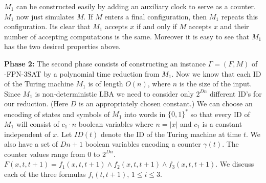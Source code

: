 $M_1$ can be constructed easily by adding an auxiliary  clock to serve 
as a counter. $M_1$ now just simulates $M$.  
If $M$ enters a final configuration, then $M_1$ repeats this
configuration. Its clear that 
$M_1$ accepts $x$
if and only if $M$ accepts $x$ and their number of
accepting computations is the same. Moreover it is easy to see that
$M_1$ has the two desired properties above.



\noindent
{\bf Phase 2:}
The second phase consists of constructing an instance 
$\Gamma = (F, M)$ of 
{-FPN-3SAT} by a polynomial time reduction from $M_1$. 
Now we know that each ID of the Turing machine $M_1$ is 
of length $O(n)$, where $n$ is the size of the input.
Since $M_1$ is non-deterministic {\sf LBA}
we need to consider only $2^{Dn}$ different ID's for
our reduction. (Here $D$ is an appropriately chosen constant.)  
We can choose
an encoding of states and symbols of $M_1$ into words in $\{0,1\}^*$ so
that every ID of $M_1$ will consist of $c_1 \cdot n$ boolean variables where
$n=|x|$ and $c_1$ is a constant independent of $x$. Let $ID(t)$ denote
the {\sf ID} of the Turing machine at time $t$. We also have 
a set of $Dn+1$ boolean variables encoding a counter $\gamma(t)$. The counter
values range from $0$ to $2^{Dn}$. 
$F(x, t,t+1) = f_1(x,t,t+1) \wedge f_2(x,t,t+1) \wedge f_3(x, t, t+1)$. 
We discuss each of the three formulas $f_i(t,t+1)$, $1 \leq i \leq 3$.

